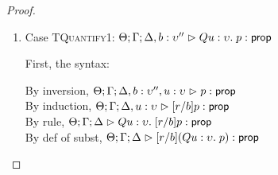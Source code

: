 \begin{proof}
\begin{enumerate}
  First, the syntax:
  \begin{tabbedproof}
    \oo By inversion, $\judgeA[\Theta; \Gamma; \Delta, b:\upsilon'']{p}{\assert}$\\
    \oo By inversion, $\judgeA[\Theta; \Gamma; \Delta, b:\upsilon'']{q}{\assert}$\\
    \oo By induction, $\judgeA[\Theta; \Gamma; \Delta]{[r/b]p}{\assert}$\\
    \oo By induction, $\judgeA[\Theta; \Gamma; \Delta]{[r/b]q}{\assert}$\\
    \oo By rule, $\judgeA[\Theta; \Gamma; \Delta]{[r/b]p \oplus [r/b]q}{\assert}$\\
    \oo By subst def, $\judgeA[\Theta; \Gamma; \Delta]{[r/b](p \oplus q)}{\assert}$\\
  \end{tabbedproof}

  For semantics, consider $\interp{\judgeA[\Theta; \Gamma; \Delta]{[r/b](p \oplus q)}{\assert}}\;\theta\;\gamma\;\delta$
  \begin{eqnproof}
    {Semantics}
    {Induction}
          {Semantics}
  \end{eqnproof}

\item Case \textsc{TQuantify1}: $\judgeA[\Theta; \Gamma; \Delta, b:\upsilon'']{Q u:\upsilon.\;p}{\assert}$
  
  First, the syntax:
  \begin{tabbedproof}
    \oo By inversion, $\judgeA[\Theta; \Gamma; \Delta, b:\upsilon'', u:\upsilon]{p}{\assert}$ \\
    \oo By induction, $\judgeA[\Theta; \Gamma; \Delta, u:\upsilon]{[r/b]p}{\assert}$ \\
    \oo By rule, $\judgeA[\Theta; \Gamma; \Delta]
                         {Q u:\upsilon.\;[r/b]p}{\assert}$ \\
    \oo By def of subst, $\judgeA[\Theta; \Gamma; \Delta]
                                 {[r/b](Q u:\upsilon.\;p)}{\assert}$ 
  \end{tabbedproof}


\end{enumerate}
\end{proof}
